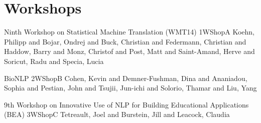 \chapter[Workshops: Thursday--Friday]{Workshops}
\thispagestyle{emptyheader}
\vfill




\clearpage
{}

\begin{wsschedule}
  {Ninth Workshop on Statistical Machine Translation (WMT14)}
  {1}{WShopA}
  {Koehn, Philipp and Bojar, Ondrej and Buck, Christian and Federmann, Christian and Haddow, Barry
    and Monz, Christof and Post, Matt and Saint-Amand, Herve and Soricut, Radu and Specia, Lucia}
  {\WShopLocA}
  
\end{wsschedule}
        
\begin{wsschedule}
  {BioNLP}
  {2}{WShopB}
  {Cohen, Kevin and Demner-Fushman, Dina and Ananiadou, Sophia and Pestian, John and Tsujii,
    Jun-ichi and Solorio, Thamar and Liu, Yang}
  {\WShopLocB}
  
\end{wsschedule}



\begin{wsschedule}
  {9th Workshop on Innovative Use of NLP for Building Educational Applications (BEA)}
  {3}{WShopC}
  {Tetreault, Joel and Burstein, Jill and Leacock, Claudia}
  {\WShopLocC}
  \clearpage
\end{wsschedule}

